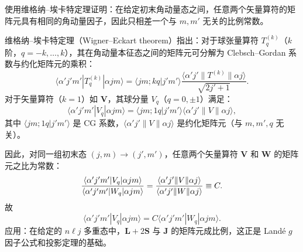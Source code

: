 \begin{question}
使用维格纳--埃卡特定理证明：在给定初末角动量态之间，任意两个矢量算符的矩阵元具有相同的角动量因子，因此只相差一个与 $m,m'$ 无关的比例常数。
\end{question}
\begin{solution}
维格纳--埃卡特定理（Wigner--Eckart theorem）指出：对于球张量算符 $T_q^{(k)}$（$k$ 阶，$q=-k,\dots,k$），其在角动量本征态之间的矩阵元可分解为 Clebsch--Gordan 系数与约化矩阵元的乘积：
\[
\langle \alpha'j'm'|T_q^{(k)}|\alpha jm\rangle
=\langle jm;kq|j'm'\rangle
\frac{\langle \alpha'j'\|T^{(k)}\|\alpha j\rangle}{\sqrt{2j'+1}}.
\]
对于矢量算符（$k=1$）如 $\mathbf V$，其球分量 $V_q$（$q=0,\pm1$）满足：
\[
\langle \alpha'j'm'|V_q|\alpha jm\rangle
=\langle jm;1q|j'm'\rangle
\langle \alpha'j'\|V\|\alpha j\rangle,
\]
其中 $\langle jm;1q|j'm'\rangle$ 是 CG 系数，$\langle \alpha'j'\|V\|\alpha j\rangle$ 是约化矩阵元（与 $m,m',q$ 无关）。

因此，对同一组初末态 $(j,m)\to(j',m')$，任意两个矢量算符 $\mathbf V$ 和 $\mathbf W$ 的矩阵元之比为常数：
\[
{\langle \alpha'j'm'|V_q|\alpha jm\rangle\over
\langle \alpha'j'm'|W_q|\alpha jm\rangle}
={\langle \alpha'j'\|V\|\alpha j\rangle\over
\langle \alpha'j'\|W\|\alpha j\rangle}
\equiv C.
\]
故
\[
\boxed{\langle \alpha'j'm'|V_q|\alpha jm\rangle
=C\langle \alpha'j'm'|W_q|\alpha jm\rangle.}
\]
应用：在给定的 $n\ell j$ 多重态中，$\mathbf L+2\mathbf S$ 与 $\mathbf J$ 的矩阵元成比例，这正是 Land\'e $g$ 因子公式和投影定理的基础。
\end{solution}

